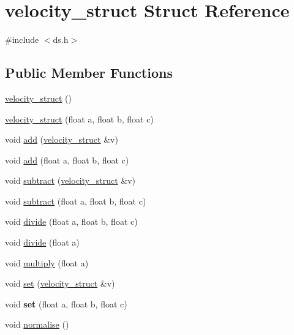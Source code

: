 \hypertarget{structvelocity__struct}{}\section{velocity\+\_\+struct Struct Reference}
\label{structvelocity__struct}


{\ttfamily \#include $<$ds.\+h$>$}

\subsection*{Public Member Functions}
\begin{DoxyCompactItemize}
\item 
\hyperlink{structvelocity__struct_a70a7b047881ced5e8fb93d98f5ecff35}{velocity\+\_\+struct} ()
\item 
\hyperlink{structvelocity__struct_aedd734505bf22e821fe06dc99abf4d2f}{velocity\+\_\+struct} (float a, float b, float c)
\item 
void \hyperlink{structvelocity__struct_ae242c474a4b628e3a3fef8e2c4eac237}{add} (\hyperlink{structvelocity__struct}{velocity\+\_\+struct} \&v)
\item 
void \hyperlink{structvelocity__struct_a7023894b2801235c09639f5e65cad6ce}{add} (float a, float b, float c)
\item 
void \hyperlink{structvelocity__struct_aeb96c6ac79c9b3ad99eb77c922147a6f}{subtract} (\hyperlink{structvelocity__struct}{velocity\+\_\+struct} \&v)
\item 
void \hyperlink{structvelocity__struct_a60dc1879f60fe6a30af5b6fc03e45130}{subtract} (float a, float b, float c)
\item 
void \hyperlink{structvelocity__struct_a86670acb34c58fa09d4e5cedec4443d1}{divide} (float a, float b, float c)
\item 
void \hyperlink{structvelocity__struct_a990e008bb7865ee859780bd91a20854b}{divide} (float a)
\item 
void \hyperlink{structvelocity__struct_abe267454a998efcb52e00a165eaf3152}{multiply} (float a)
\item 
void \hyperlink{structvelocity__struct_a1a5eaa41a8a7d1b903ec41ff24eae038}{set} (\hyperlink{structvelocity__struct}{velocity\+\_\+struct} \&v)
\item 
void {\bfseries set} (float a, float b, float c)\hypertarget{structvelocity__struct_a0b922d8a550f815c3b9723555b579250}{}\label{structvelocity__struct_a0b922d8a550f815c3b9723555b579250}

\item 
void \hyperlink{structvelocity__struct_af6ec92248437baf45850b8dc877ab5d4}{normalise} ()
\end{DoxyCompactItemize}
